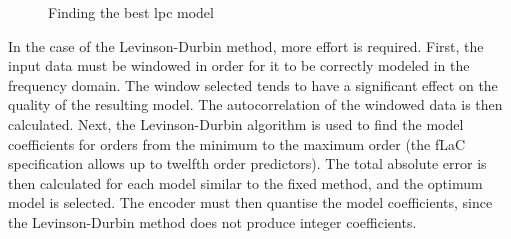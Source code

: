 \documentclass[12pt]{scrartcl}
\begin{document}
  
  \begin{figure}[H]
    \caption{Finding the best lpc model}
    \label{fig:lpc_optimisation}
  \end{figure}
  In the case of the Levinson-Durbin method, more effort is required. First, the input data must be windowed in order for it to be correctly modeled in the frequency domain\cite{hamming_reason}. The window selected tends to have a significant effect on the quality of the resulting model. The autocorrelation of the windowed data is then calculated. Next, the Levinson-Durbin algorithm is used to find the model coefficients for orders from the minimum to the maximum order (the fLaC specification allows up to twelfth order predictors\cite{flac_format}). The total absolute error is then calculated for each model similar to the fixed method, and the optimum model is selected. The encoder must then quantise the model coefficients, since the Levinson-Durbin method does not produce integer coefficients. 
  
\end{document}
